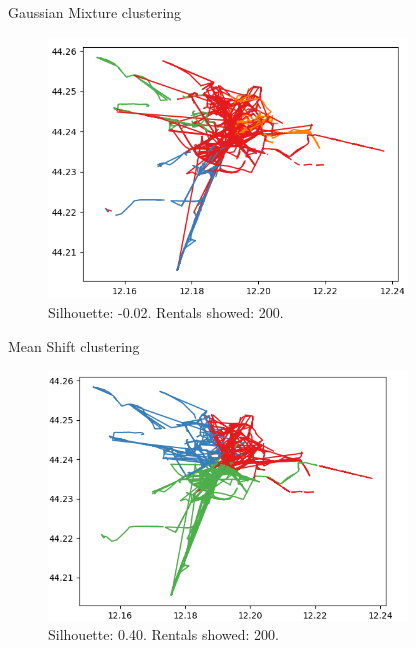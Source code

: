 \documentclass{beamer}
\begin{document}
\begin{frame}{Gaussian Mixture clustering}
\begin{figure}[bt]
	\centering
	\includegraphics[width=0.85\textwidth]{gaussian-mixture-plot}
	\caption{Silhouette: -0.02. Rentals showed: 200.}
	\label{fig:gaussian-mixture-line}
\end{figure}
\end{frame}

\begin{frame}{Mean Shift clustering}
\begin{figure}[bt]
	\centering
	\includegraphics[width=0.85\textwidth]{mean-shift-plot}
	\caption{Silhouette: 0.40. Rentals showed: 200.}
	\label{fig:mean-shift-line}
\end{figure}
\end{frame}
\end{document}
